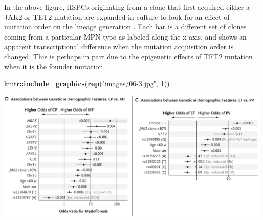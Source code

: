 \documentclass[]{book}
\newenvironment{Shaded}{\begin{snugshade}}{\end{snugshade}}
\newcommand{\DataTypeTok}[1]{\textcolor[rgb]{0.13,0.29,0.53}{#1}}
\newcommand{\DecValTok}[1]{\textcolor[rgb]{0.00,0.00,0.81}{#1}}
\newcommand{\KeywordTok}[1]{\textcolor[rgb]{0.13,0.29,0.53}{\textbf{#1}}}
\newcommand{\NormalTok}[1]{#1}
\newcommand{\OperatorTok}[1]{\textcolor[rgb]{0.81,0.36,0.00}{\textbf{#1}}}
\newcommand{\OtherTok}[1]{\textcolor[rgb]{0.56,0.35,0.01}{#1}}
\newcommand{\StringTok}[1]{\textcolor[rgb]{0.31,0.60,0.02}{#1}}
\begin{document}
\begin{Shaded}
\end{Shaded}

In the above figure, HSPCs originating from a clone that first acquired either a JAK2 or TET2 mutation are expanded in culture to look for an effect of mutation order on the lineage generation \citep{ortmann2015effect}. Each bar is a different set of clones coming from a particular MPN type as labeled along the x-axis, and shows an apparent transcriptional difference when the mutation acquisition order is changed. This is perhaps in part due to the epigenetic effects of TET2 mutation when it is the founder mutation.

\begin{Shaded}
\begin{Highlighting}[]
\NormalTok{knitr}\OperatorTok{::}\KeywordTok{include_graphics}\NormalTok{(}\KeywordTok{rep}\NormalTok{(}\StringTok{"images/06-3.jpg"}\NormalTok{, }\DecValTok{1}\NormalTok{))          }
\end{Highlighting}
\end{Shaded}

\includegraphics{images/06-3.jpg}

\begin{Shaded}
\end{Shaded}
\end{document}
